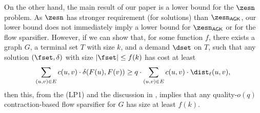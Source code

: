 On the other hand, the main result of our paper is a lower bound for the $\zesn$ problem. As $\zesn$ has stronger requirement (for solutions) than $\zesn_{\textsf{AGK}}$, our lower bound does not immediately imply a lower bound for $\zesn_{\textsf{AGK}}$ or for the flow sparsifier. However, if we can show that, for some function $f$, there exists a graph $G$, a terminal set $T$ with size $k$, and a demand $\dset$ on $T$, such that any solution $(\fset,\delta)$ with size $|\fset|\le f(k)$ has cost at least
\[\sum_{(u,v)\in E}c(u,v)\cdot\delta(F(u),F(v))\ge q\cdot \sum_{(u,v)\in E}c(u,v)\cdot\dist_{\ell}(u,v),\] 
then this, from the (LP1) and the discussion in \cite{andoni2014towards}, implies that any quality-$o(q)$ contraction-based flow sparsifier for $G$ has size at least $f(k)$.
